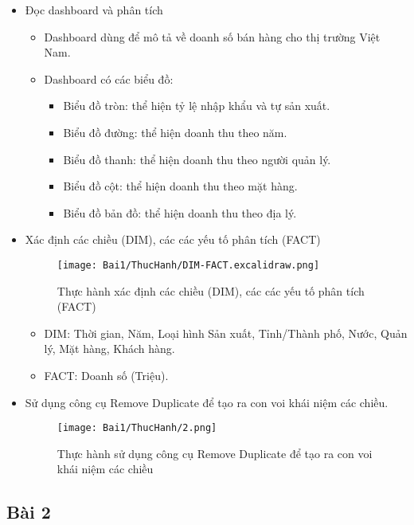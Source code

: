 \documentclass{article}
\begin{document}
\begin{itemize}
\item Đọc dashboard và phân tích
\begin{itemize}
\item Dashboard dùng để mô tả về doanh số bán hàng cho thị trường Việt Nam.
\item Dashboard có các biểu đồ:
\begin{itemize}
\item Biểu đồ tròn: thể hiện tỷ lệ nhập khẩu và tự sản xuất.
\item Biểu đồ đường: thể hiện doanh thu theo năm.
\item Biểu đồ thanh: thể hiện doanh thu theo người quản lý.
\item Biểu đồ cột: thể hiện doanh thu theo mặt hàng.
\item Biểu đồ bản đồ: thể hiện doanh thu theo địa lý.
\end{itemize}
\end{itemize}
\item Xác định các chiều (DIM), các các yếu tố phân tích (FACT)

\begin{figure}[H]
\centering
\texttt{[image: Bai1/ThucHanh/DIM-FACT.excalidraw.png]}
\caption{Thực hành xác định các chiều (DIM), các các yếu tố phân tích (FACT)}
\end{figure}

\begin{itemize}
\item DIM: Thời gian, Năm, Loại hình Sản xuất, Tỉnh/Thành phố, Nước, Quản lý, Mặt hàng, Khách hàng.
\item FACT: Doanh số (Triệu).
\end{itemize}

\item Sử dụng công cụ Remove Duplicate để tạo ra con voi khái niệm các chiều.

\begin{figure}[H]
\centering
\texttt{[image: Bai1/ThucHanh/2.png]}
\caption{Thực hành sử dụng công cụ Remove Duplicate để tạo ra con voi khái niệm các chiều}
\end{figure}

\end{itemize}

\subsection{Bài 2}
\end{document}
